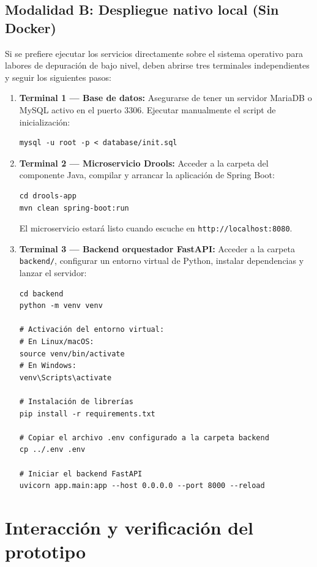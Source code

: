 \subsection{Modalidad B: Despliegue nativo local (Sin Docker)}

Si se prefiere ejecutar los servicios directamente sobre el sistema operativo para labores de depuración de bajo nivel, deben abrirse tres terminales independientes y seguir los siguientes pasos:

\begin{enumerate}
    \item \textbf{Terminal 1 — Base de datos:} Asegurarse de tener un servidor MariaDB o MySQL activo en el puerto 3306. Ejecutar manualmente el script de inicialización:
\begin{verbatim}
mysql -u root -p < database/init.sql
\end{verbatim}

    \item \textbf{Terminal 2 — Microservicio Drools:} Acceder a la carpeta del componente Java, compilar y arrancar la aplicación de Spring Boot:
\begin{verbatim}
cd drools-app
mvn clean spring-boot:run
\end{verbatim}
    El microservicio estará listo cuando escuche en \texttt{http://localhost:8080}.

    \item \textbf{Terminal 3 — Backend orquestador FastAPI:} Acceder a la carpeta \texttt{backend/}, configurar un entorno virtual de Python, instalar dependencias y lanzar el servidor:
\begin{verbatim}
cd backend
python -m venv venv

# Activación del entorno virtual:
# En Linux/macOS:
source venv/bin/activate
# En Windows:
venv\Scripts\activate

# Instalación de librerías
pip install -r requirements.txt

# Copiar el archivo .env configurado a la carpeta backend
cp ../.env .env

# Iniciar el backend FastAPI
uvicorn app.main:app --host 0.0.0.0 --port 8000 --reload
\end{verbatim}
\end{enumerate}

\section{Interacción y verificación del prototipo}

